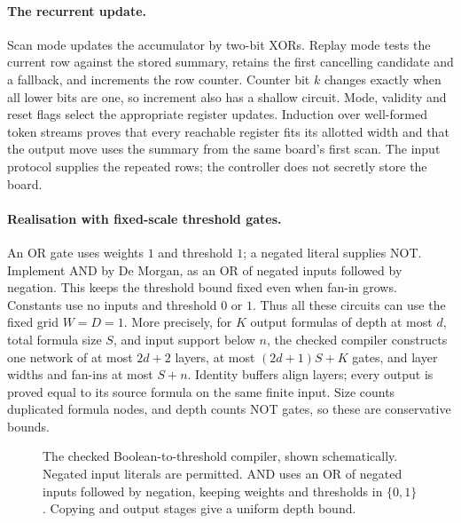 \documentclass[11pt]{article}
\theoremstyle{plain}
\theoremstyle{definition}
\theoremstyle{remark}
\numberwithin{equation}{section}
\begin{document}
\paragraph{The recurrent update.}
Scan mode updates the accumulator by two-bit XORs. Replay mode tests the current row against the stored summary, retains the first cancelling candidate and a fallback, and increments the row counter. Counter bit $k$ changes exactly when all lower bits are one, so increment also has a shallow circuit. Mode, validity and reset flags select the appropriate register updates. Induction over well-formed token streams proves that every reachable register fits its allotted width and that the output move uses the summary from the same board's first scan. The input protocol supplies the repeated rows; the controller does not secretly store the board.

\paragraph{Realisation with fixed-scale threshold gates.}
An OR gate uses weights $1$ and threshold $1$; a negated literal supplies NOT. Implement AND by De Morgan, as an OR of negated inputs followed by negation. This keeps the threshold bound fixed even when fan-in grows. Constants use no inputs and threshold $0$ or $1$. Thus all these circuits can use the fixed grid $W=D=1$.
More precisely, for $K$ output formulas of depth at most $d$, total formula size $S$, and input support below $n$, the checked compiler constructs one network of at most $2d+2$ layers, at most $(2d+1)S+K$ gates, and layer widths and fan-ins at most $S+n$. Identity buffers align layers; every output is proved equal to its source formula on the same finite input. Size counts duplicated formula nodes, and depth counts NOT gates, so these are conservative bounds.


\begin{figure}[htbp]
\centering
{}
\caption{The checked Boolean-to-threshold compiler, shown schematically. Negated input literals are permitted. AND uses an OR of negated inputs followed by negation, keeping weights and thresholds in $\{0,1\}$. Copying and output stages give a uniform depth bound.}
\label{fig:threshold-compilation}
\end{figure}
\end{document}
